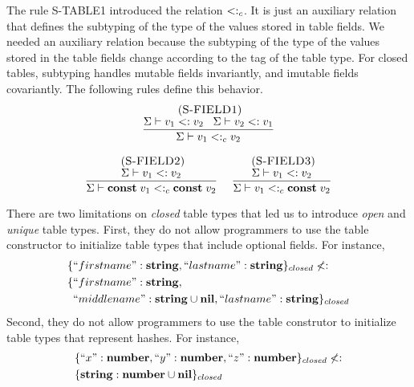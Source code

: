 The rule \textsc{S-TABLE1} introduced the relation $<:_{c}$.
It is just an auxiliary relation that defines the subtyping of the
type of the values stored in table fields.
We needed an auxiliary relation because the subtyping of the type
of the values stored in the table fields change according to the
tag of the table type.
For closed tables, subtyping handles mutable fields invariantly,
and imutable fields covariantly.
The following rules define this behavior.
\[
\begin{array}{c}
\begin{array}{c}
\; (\textsc{S-FIELD1})\\
\dfrac{\Sigma \vdash v_{1} <: v_{2} \;\;\;
       \Sigma \vdash v_{2} <: v_{1}}
      {\Sigma \vdash v_{1} <:_{c} v_{2}}
\end{array}
\\ \\
\begin{array}{c}
\; (\textsc{S-FIELD2})\\
\dfrac{\Sigma \vdash v_{1} <: v_{2}}
      {\Sigma \vdash \mathbf{const} \; v_{1} <:_{c} \mathbf{const} \; v_{2}}
\end{array}
\;
\begin{array}{c}
\; (\textsc{S-FIELD3})\\
\dfrac{\Sigma \vdash v_{1} <: v_{2}}
      {\Sigma \vdash v_{1} <:_{c} \mathbf{const} \; v_{2}}
\end{array}
\end{array}
\]

There are two limitations on \emph{closed} table types that led us to
introduce \emph{open} and \emph{unique} table types.
First, they do not allow programmers to use the table constructor to
initialize table types that include optional fields.
For instance,
\begin{align*}
\{ & ``firstname":\mathbf{string}, ``lastname":\mathbf{string} \}_{closed} \not <:\\
\{ & ``firstname":\mathbf{string},\\
  &  ``middlename":\mathbf{string} \cup \mathbf{nil}, ``lastname":\mathbf{string} \}_{closed}
\end{align*}
Second, they do not allow programmers to use the table construtor to
initialize table types that represent hashes.
For instance,
\begin{align*}
\{ & ``x":\mathbf{number}, ``y":\mathbf{number}, ``z":\mathbf{number} \}_{closed} \not <:\\
\{ & \mathbf{string}:\mathbf{number} \cup \mathbf{nil}\}_{closed}
\end{align*}

